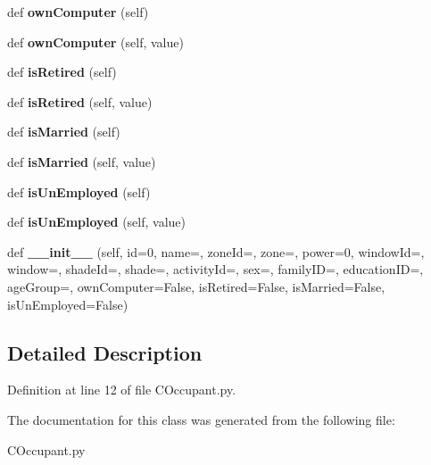 \begin{DoxyCompactItemize}
def {\bfseries own\+Computer} (self)
\item 
\mbox{\label{class_c_occupant_1_1_c_occupant_ab974a46cc60baeb212aa812602fa2eed}} 
def {\bfseries own\+Computer} (self, value)
\item 
\mbox{\label{class_c_occupant_1_1_c_occupant_a7c7c5a0fc017c9ec665717842c4f4e67}} 
def {\bfseries is\+Retired} (self)
\item 
\mbox{\label{class_c_occupant_1_1_c_occupant_a8b38f4f59dda44568dfeb4eb6961d8bd}} 
def {\bfseries is\+Retired} (self, value)
\item 
\mbox{\label{class_c_occupant_1_1_c_occupant_a78e6786872d42edd1f116cf002a88740}} 
def {\bfseries is\+Married} (self)
\item 
\mbox{\label{class_c_occupant_1_1_c_occupant_a79380d637b350ffdcdc6f72a8a28405b}} 
def {\bfseries is\+Married} (self, value)
\item 
\mbox{\label{class_c_occupant_1_1_c_occupant_a1904b99f5ec8532431543db3bf3a644a}} 
def {\bfseries is\+Un\+Employed} (self)
\item 
\mbox{\label{class_c_occupant_1_1_c_occupant_a67b635cd2fcec6bba83c64e3fa3ca666}} 
def {\bfseries is\+Un\+Employed} (self, value)
\item 
\mbox{\label{class_c_occupant_1_1_c_occupant_af5b9c2383c9368414aac2740c737d9d9}} 
def {\bfseries \+\_\+\+\_\+init\+\_\+\+\_\+} (self, id=0, name=\textquotesingle{}\textquotesingle{}, zone\+Id=\textquotesingle{}\textquotesingle{}, zone=\textquotesingle{}\textquotesingle{}, power=0, window\+Id=\textquotesingle{}\textquotesingle{}, window=\textquotesingle{}\textquotesingle{}, shade\+Id=\textquotesingle{}\textquotesingle{}, shade=\textquotesingle{}\textquotesingle{}, activity\+Id=\textquotesingle{}\textquotesingle{}, sex=\textquotesingle{}\textquotesingle{}, family\+ID=\textquotesingle{}\textquotesingle{}, education\+ID=\textquotesingle{}\textquotesingle{}, age\+Group=\textquotesingle{}\textquotesingle{}, own\+Computer=False, is\+Retired=False, is\+Married=False, is\+Un\+Employed=False)
\end{DoxyCompactItemize}


\subsection{Detailed Description}


Definition at line 12 of file C\+Occupant.\+py.



The documentation for this class was generated from the following file\+:\begin{DoxyCompactItemize}
\item 
C\+Occupant.\+py\end{DoxyCompactItemize}
